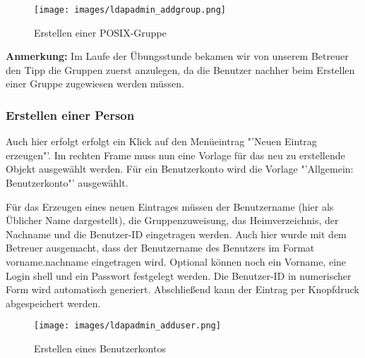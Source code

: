 \begin{figure}[!h]
	\begin{center}
		\texttt{[image: images/ldapadmin\_addgroup.png]}
		\caption{Erstellen einer POSIX-Gruppe}
		\label{ldapadmin_addgroup}
	\end{center}
\end{figure}

\textbf{Anmerkung:} Im Laufe der Übungsstunde bekamen wir von unserem Betreuer den Tipp die Gruppen zuerst anzulegen, da die Benutzer nachher beim Erstellen einer Gruppe zugewiesen werden müssen.

\newpage

\subsubsection{Erstellen einer Person}
\label{sec:Erstellen einer Person}
Auch hier erfolgt erfolgt ein Klick auf den Menüeintrag "'Neuen Eintrag erzeugen"'. Im rechten Frame muss nun eine Vorlage für das neu zu erstellende Objekt ausgewählt werden. Für ein Benutzerkonto wird die Vorlage "'Allgemein: Benutzerkonto"' ausgewählt.

Für das Erzeugen eines neuen Eintrages müssen der Benutzername (hier als Üblicher Name dargestellt), die Gruppenzuweisung, das Heimverzeichnis, der Nachname und die Benutzer-ID eingetragen werden. Auch hier wurde mit dem Betreuer ausgemacht, dass der Benutzername des Benutzers im Format vorname.nachname eingetragen wird. Optional können noch ein Vorname, eine Login shell und ein Passwort festgelegt werden. Die Benutzer-ID in numerischer Form wird automatisch generiert.
Abschließend kann der Eintrag per Knopfdruck abgespeichert werden.

\begin{figure}[!h]
	\begin{center}
		\texttt{[image: images/ldapadmin\_adduser.png]}
		\caption{Erstellen eines Benutzerkontos}
		\label{ldapadmin_adduser}
	\end{center}
\end{figure}

